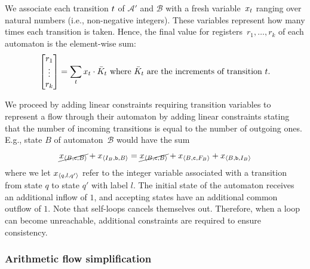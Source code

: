 We associate each transition $t$ of $\mathcal{A}'$ and $\mathcal{B}$ with a fresh
variable~$x_t$ ranging over natural numbers (i.e.,
non-negative integers).
These variables represent how many times each
transition is taken. Hence, the final value for registers~$r_1, \ldots,
r_k$ of each automaton is the element-wise sum:
\begin{equation}\label{eq:counter-sums}
\begin{bmatrix} 
  r_1 \\
  \vdots\\
  r_k \\
\end{bmatrix} = \sum_t x_t \cdot 
  \bar{K}_t \text{ where $\bar{K}_t$ are the increments of transition $t$}.
\end{equation}

We proceed by adding linear constraints requiring transition variables to
represent a flow through their automaton by adding linear constraints stating
that the number of incoming transitions is equal to the number of outgoing ones.
E.g., state $B$ of automaton~$\mathcal{B}$ would have the sum
%
\begin{equation}\label{eq:flow-eqs}
  \cancel{x_{\left\langle B, \texttt{c}, B\right\rangle}} +
  x_{\left\langle I_B, \texttt{b}, B\right\rangle} = \cancel{x_{\left\langle B, \texttt{c}, B\right\rangle}}  +
  x_{\left\langle B, \texttt{c}, F_B\right\rangle} + x_{\left\langle B, \texttt{b}, I_B\right\rangle}
\end{equation}
%
where we let
$x_{\left\langle q, l, q'\right\rangle}$ refer to the integer variable associated with a
transition from state $q$ to state $q'$ with label $l$. The initial state
of the automaton receives an additional inflow of $1$, and accepting
states have an additional common outflow of $1$. Note that self-loops
cancels themselves out. Therefore, when a loop can become
unreachable, additional constraints are required to ensure consistency.


\subsubsection{Arithmetic flow simplification}\label{sec:intuition:algebra}

